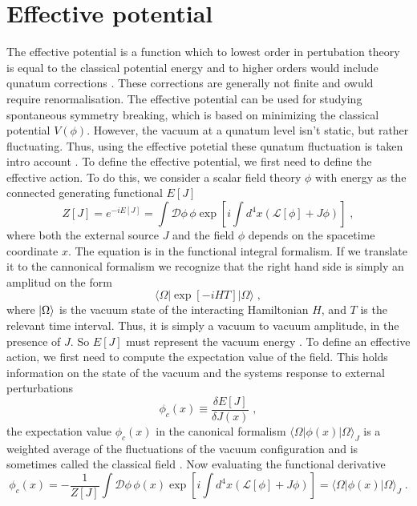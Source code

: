 \section{Effective potential}
The effective potential is a function which to lowest order in pertubation theory is equal to the classical potential energy and to higher orders would include qunatum corrections \cite{Peskin:1995ev}. These corrections are generally not finite and owuld require renormalisation. The effective potential can be used for studying spontaneous symmetry breaking, which is based on minimizing the classical potential $V(\phi)$. However, the vacuum at a qunatum level isn't static, but rather fluctuating. Thus, using the effective potetial these qunatum fluctuation is taken intro account \cite{zee}.
To define the effective potential, we first need to define the effective action. To do this, we consider a scalar field theory $\phi$  with energy as the connected generating functional $E[J]$
\begin{equation}
    Z[J]=e^{-i E[J]}= \int \mathcal{D}\phi\,\phi \exp\left[i\int d^4x (\mathcal{L}[\phi]+J\phi)\right]\;,
\end{equation}
where both the external source $J$ and the field $\phi$ depends on the spacetime coordinate $x$. The equation is in the functional integral formalism. If we translate it to the cannonical formalism we recognize that the right hand side is simply an amplitud on the form
\begin{equation}
    \langle \Omega | \exp\left[-iHT\right] |\Omega\rangle\;,
\end{equation}
where $\ket \Omega$ is the vacuum state of the interacting Hamiltonian $H$, and $T$ is the relevant time interval. Thus, it is simply a vacuum to vacuum amplitude, in the presence of $J$. So $E[J]$ must represent the vacuum energy \cite{Peskin:1995ev}. To define an effective action, we first need to compute the expectation value of the field. This holds information on the state of the vacuum and the systems response to external perturbations
\begin{equation}    
    \phi_{c}(x)\equiv\frac{\delta E[J]}{\delta J(x)}\;,
\end{equation}
the expectation value $\phi_c(x)$ in the canonical formalism $\langle \Omega | \phi(x) |\Omega\rangle_J   $ is a weighted average of the fluctuations of the vacuum configuration and is sometimes called the classical field \cite{Peskin:1995ev}. Now evaluating the functional derivative
\begin{equation}
    \phi_c(x)=-\frac{1}{Z[J]}\int \mathcal{D}\phi\,\phi(x) \exp\left[i\int d^4x (\mathcal{L}[\phi]+J\phi)\right]=\langle \Omega | \phi(x) |\Omega\rangle_J\;.
\end{equation}
